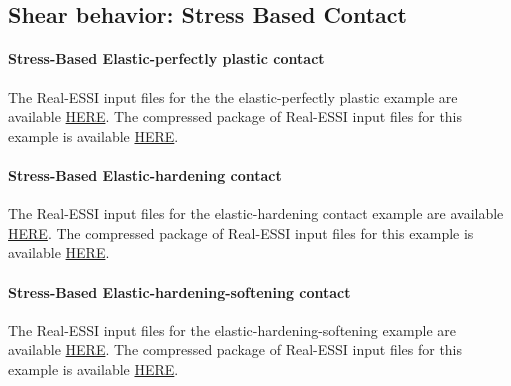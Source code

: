 \clearpage
\newpage
\subsection{ Shear behavior: Stress Based Contact }


\paragraph{Stress-Based Elastic-perfectly plastic contact}
The Real-ESSI input files for the the elastic-perfectly plastic example are available 
\href{http://sokocalo.engr.ucdavis.edu/~jeremic/lecture_notes_online_material/_Chapter_Short_Course_Examples/Day3/Contact_Examples/shear/SoftContact_Elastic_Perfectly_Plastic_Shear_Model}{HERE}. 
The compressed package of Real-ESSI input files for this example is available 
\href{http://sokocalo.engr.ucdavis.edu/~jeremic/lecture_notes_online_material/_Chapter_Short_Course_Examples/Day3/Contact_Examples/shear/SoftContact_Elastic_Perfectly_Plastic_Shear_Model/_all_files_packaged_for_SoftContact_Elastic_Perfectly_Plastic_Shear_Model.tar.gz}{HERE}. 


\paragraph{Stress-Based Elastic-hardening contact}

The Real-ESSI input files for the elastic-hardening contact example are available 
\href{http://sokocalo.engr.ucdavis.edu/~jeremic/lecture_notes_online_material/_Chapter_Short_Course_Examples/Day3/Contact_Examples/shear/SoftContact_Nonlinear_Hardening_Shear_Model}{HERE}. 
The compressed package of Real-ESSI input files for this example is available 
\href{http://sokocalo.engr.ucdavis.edu/~jeremic/lecture_notes_online_material/_Chapter_Short_Course_Examples/Day3/Contact_Examples/shear/SoftContact_Nonlinear_Hardening_Shear_Model/_all_files_packaged_for_SoftContact_Nonlinear_Hardening_Shear_Model.tar.gz}{HERE}. 



\paragraph{Stress-Based Elastic-hardening-softening contact}

The Real-ESSI input files for the elastic-hardening-softening example are available 
\href{http://sokocalo.engr.ucdavis.edu/~jeremic/lecture_notes_online_material/_Chapter_Short_Course_Examples/Day3/Contact_Examples/shear/SoftContact_Nonlinear_Hardening_Softening_Shear_Model}{HERE}. 
The compressed package of Real-ESSI input files for this example is available 
\href{http://sokocalo.engr.ucdavis.edu/~jeremic/lecture_notes_online_material/_Chapter_Short_Course_Examples/Day3/Contact_Examples/shear/SoftContact_Nonlinear_Hardening_Softening_Shear_Model/_all_files_packaged_for_SoftContact_Nonlinear_Hardening_Softening_Shear_Model.tar.gz}{HERE}. 



